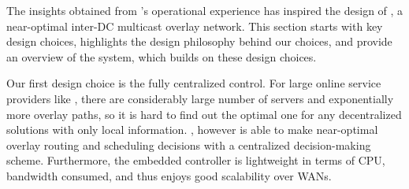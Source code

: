 \begin{table}[t]
\centering
{}
\caption{\name's design choices and their benefit-cost tradeoffs}
\label{tab:design-choices}
\end{table}

The insights obtained from \company's operational experience has inspired the design of \name, a near-optimal inter-DC multicast overlay network. This section starts with \name key design choices, highlights the design philosophy behind our choices, and provide an overview of the \name system, which builds on these design choices.

Our first design choice is the fully centralized control. For large online service providers like \company, there are considerably large number of servers and exponentially more overlay paths, so it is hard to find out the optimal one for any decentralized solutions with only local information. \name, however is able to make near-optimal overlay routing and scheduling decisions with a centralized decision-making scheme. Furthermore, the embedded controller is lightweight in terms of CPU, bandwidth consumed, and thus enjoys good scalability over WANs.

